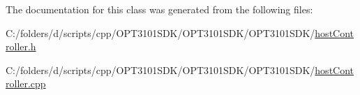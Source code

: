 The documentation for this class was generated from the following files\+:\begin{DoxyCompactItemize}
\item 
C\+:/folders/d/scripts/cpp/\+O\+P\+T3101\+S\+D\+K/\+O\+P\+T3101\+S\+D\+K/\+O\+P\+T3101\+S\+D\+K/\mbox{\hyperlink{host_controller_8h}{host\+Controller.\+h}}\item 
C\+:/folders/d/scripts/cpp/\+O\+P\+T3101\+S\+D\+K/\+O\+P\+T3101\+S\+D\+K/\+O\+P\+T3101\+S\+D\+K/\mbox{\hyperlink{host_controller_8cpp}{host\+Controller.\+cpp}}\end{DoxyCompactItemize}
